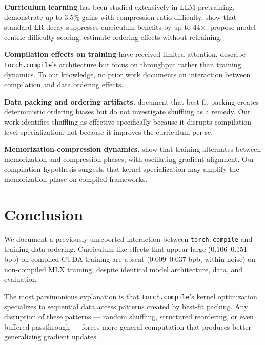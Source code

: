 \documentclass{article}
\begin{document}
\textbf{Curriculum learning} has been studied extensively in LLM
pretraining. \citet{beyondrandom2025} demonstrate up to 3.5\% gains with
compression-ratio difficulty. \citet{lrdecay2025} show that standard LR
decay suppresses curriculum benefits by up to 44$\times$.
\citet{influence2025} propose model-centric difficulty scoring.
\citet{yang2025estimating} estimate ordering effects without retraining.

\textbf{Compilation effects on training} have received limited attention.
\citet{pytorch2compile} describe \texttt{torch.compile}'s architecture
but focus on throughput rather than training dynamics.
To our knowledge, no prior work documents an interaction between
compilation and data ordering effects.

\textbf{Data packing and ordering artifacts.}
\citet{fewertruncations2024} document that best-fit packing creates
deterministic ordering biases but do not investigate shuffling as a
remedy. Our work identifies shuffling as effective specifically because
it disrupts compilation-level specialization, not because it improves
the curriculum per se.

\textbf{Memorization-compression dynamics.}
\citet{gapt2025} show that training alternates between memorization and
compression phases, with oscillating gradient alignment. Our compilation
hypothesis suggests that kernel specialization may amplify the
memorization phase on compiled frameworks.

\section{Conclusion}\label{sec:conclusion}

We document a previously unreported interaction between
\texttt{torch.compile} and training data ordering.
Curriculum-like effects that appear large (0.106--0.151 bpb) on
compiled CUDA training are absent (0.009--0.037 bpb, within noise)
on non-compiled MLX training, despite identical model architecture,
data, and evaluation.

The most parsimonious explanation is that \texttt{torch.compile}'s
kernel optimization specializes to sequential data access patterns
created by best-fit packing. Any disruption of these patterns ---
random shuffling, structured reordering, or even buffered passthrough
--- forces more general computation that produces better-generalizing
gradient updates.
\end{document}
